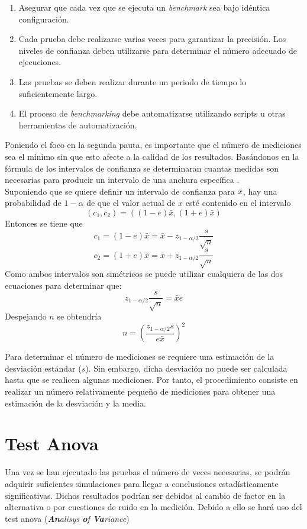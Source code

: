 \begin{enumerate}
    \item Asegurar que cada vez que se ejecuta un \textit{benchmark} sea bajo idéntica configuración.
    \item Cada prueba debe realizarse varias veces para garantizar la precisión. Los niveles de confianza deben utilizarse para determinar el número adecuado de ejecuciones.
    \item Las pruebas se deben realizar durante un periodo de tiempo lo suficientemente largo.
    \item El proceso de \textit{benchmarking} debe automatizarse utilizando scripts u otras herramientas de automatización.
\end{enumerate}

Poniendo el foco en la segunda pauta, es importante que el número de mediciones sea el mínimo sin que esto afecte a la calidad de los resultados. Basándonos en la fórmula de los intervalos de confianza se determinaran cuantas medidas son necesarias para producir un intervalo de una anchura específica \cite{lilja_2000}. \\

Suponiendo que se quiere definir un intervalo de confianza para $\Bar{x}$, hay una probabilidad de $1-\alpha$ de que el valor actual de $x$ esté contenido en el intervalo  $$
\left(c_{1}, c_{2}\right)=((1-e) \bar{x},(1+e) \bar{x})
$$ 
Entonces se tiene que 
$$
c_{1}=(1-e) \bar{x}=\bar{x}-z_{1-\alpha / 2} \frac{s}{\sqrt{n}}
$$
$$
c_{2}=(1+e) \bar{x}=\bar{x}+z_{1-\alpha / 2} \frac{s}{\sqrt{n}}
$$
Como ambos intervalos son simétricos se puede utilizar cualquiera de las dos ecuaciones para determinar que:
$$
z_{1-\alpha / 2} \frac{s}{\sqrt{n}}=\bar{x} e
$$
Despejando $n$ se obtendría
\begin{equation}
\label{eqn:n-ejecuciones}
n=\left(\frac{z_{1-\alpha / 2} s}{e \bar{x}}\right)^{2}
\end{equation}
 

Para determinar el número de mediciones se requiere una estimación de la desviación estándar ($s$). Sin embargo,  dicha desviación no puede ser calculada hasta que se realicen algunas mediciones. Por tanto, el procedimiento consiste en realizar un número relativamente pequeño de mediciones para obtener una estimación de la desviación y la media\cite{lilja_2000}. 


\section{Test Anova}\label{anova_section}
Una vez se han ejecutado las pruebas el número de veces necesarias, se podrán adquirir suficientes simulaciones para llegar a conclusiones estadísticamente significativas. Dichos resultados podrían ser debidos al cambio de factor en la alternativa o por cuestiones de ruido en la medición. Debido a ello se hará uso del test anova (\textit{\textbf{An}alisys \textbf{o}f \textbf{Va}riance})\\

